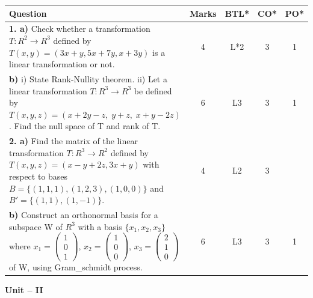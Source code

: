 \documentclass[11pt,a4paper]{article}
\begin{document}
\noindent
\begin{tabular}{|p{10.5cm}|c|c|c|c|}
\hline
\textbf{Question} & \textbf{Marks} & \textbf{BTL*} & \textbf{CO*} & \textbf{PO*} \\
\hline
\textbf{1. a)} Check whether a transformation $T:R^2 \to R^3$ defined by $T(x,y) = (3x + y, 5x + 7y, x + 3y)$ is a linear transformation or not. & 4 & L*2 & 3 & 1 \\
\hline
\textbf{b)} i) State Rank-Nullity theorem. \newline
ii) Let a linear transformation $T: R^3 \to R^3$ be defined by $T(x,y,z) = (x + 2y - z, \; y + z, \; x + y - 2z)$. Find the null space of T and rank of T. & 6 & L3 & 3 & 1 \\
\hline
\textbf{2. a)} Find the matrix of the linear transformation $T:R^3 \to R^2$ defined by $T(x,y,z) = (x - y + 2z, 3x + y)$ with respect to bases $B = \{(1,1,1), (1,2,3), (1,0,0)\}$ and $B' = \{(1,1), (1,-1)\}$. & 4 & L2 & 3 & ~ \\
\hline
\textbf{b)} Construct an orthonormal basis for a subspace W of $R^3$ with a basis $\{x_1, x_2, x_3\}$ where $x_1 = \begin{pmatrix} 1 \\ 0 \\ 1 \end{pmatrix}$, $x_2 = \begin{pmatrix} 1 \\ 0 \\ 0 \end{pmatrix}$, $x_3 = \begin{pmatrix} 2 \\ 1 \\ 0 \end{pmatrix}$ of W, using Gram\_schmidt process. & 6 & L3 & 3 & 1 \\
\hline
\end{tabular}

\vspace{0.4cm}

\begin{center}
{\large \textbf{Unit -- II}}
\end{center}
\end{document}
